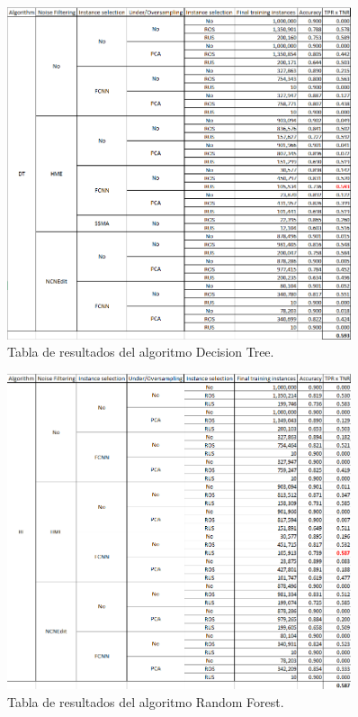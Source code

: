 \begin{figure}[ht]
    \centerfloat
    \includegraphics[width=0.9\textwidth]{img/dt.png}
    \caption{Tabla de resultados del algoritmo Decision Tree.}
\end{figure}

\begin{figure}[ht]
    \centerfloat
    \includegraphics[width=0.9\textwidth]{img/rf.png}
    \caption{Tabla de resultados del algoritmo Random Forest.}
\end{figure}